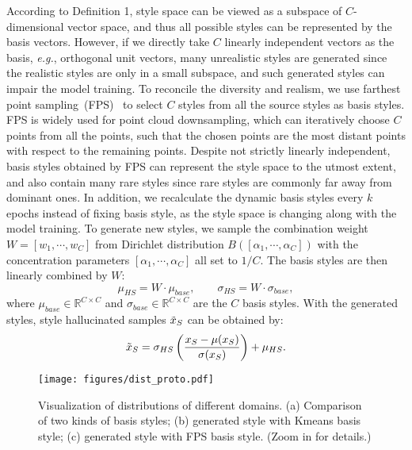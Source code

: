 \documentclass[runningheads]{llncs}
\def\eg{\emph{e.g.}} \def\Eg{\emph{E.g.}}
\begin{document}
According to Definition 1, style space can be viewed as a subspace of $C$-dimensional vector space, and thus all possible styles can be represented by the basis vectors.
However, if we directly take $C$ linearly independent vectors as the basis, \eg, orthogonal unit vectors, many unrealistic styles are generated since the realistic styles are only in a small subspace, and such generated styles can impair the model training. 
To reconcile the diversity and realism, we use farthest point sampling~(FPS)~\cite{qi2017pointnet++} to select $C$ styles from all the source styles as basis styles. 
FPS is widely used for point cloud downsampling, which can iteratively choose $C$ points from all the points, such that the chosen points are the most distant points with respect to the remaining points.
Despite not strictly linearly independent, basis styles obtained by FPS can represent the style space to the utmost extent, and also contain many rare styles since rare styles are commonly far away from dominant ones. 
In addition, we recalculate the dynamic basis styles every $k$ epochs instead of fixing basis style, as the style space is changing along with the model training. To generate new styles, we sample the combination weight $W=[w_1, \cdots, w_C]$ from Dirichlet distribution $B([\alpha_1, \cdots, \alpha_C])$ with the concentration parameters $[\alpha_1, \cdots, \alpha_C]$ all set to $1/C$. 
The basis styles are then linearly combined by $W$:
\begin{equation}
    \mu_{HS} = W\cdot \mu_{base}, \qquad \sigma_{HS} = W \cdot \sigma_{base},
\end{equation}
where $\mu_{base}\in \mathbb{R}^{C\times C}$ and $\sigma_{base} \in \mathbb{R}^{C\times C}$ are the $C$ basis styles. With the generated styles, style hallucinated samples $\Tilde{x}_S$ can be obtained by:
\begin{equation}
    \Tilde{x}_S = \sigma_{HS}\left(\frac{x_S-\mu(x_S)}{\sigma(x_S)}\right)+\mu_{HS}.
\end{equation}

\begin{figure}[t]
    \centering
    \texttt{[image: figures/dist\_proto.pdf]}
\caption{Visualization of distributions of different domains. (a) Comparison of two kinds of basis styles; (b) generated style with Kmeans basis style; (c) generated style with FPS basis style. (Zoom in for details.) }
    \label{fig:visual-dist}
\end{figure}
\end{document}
